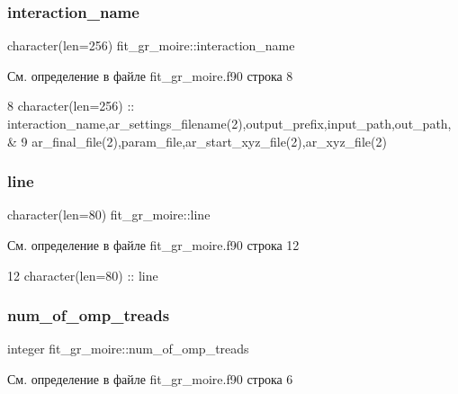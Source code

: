 \subsubsection{\texorpdfstring{interaction\+\_\+name}{interaction\_name}}
{\footnotesize\ttfamily character(len=256) fit\+\_\+gr\+\_\+moire\+::interaction\+\_\+name}



См. определение в файле fit\+\_\+gr\+\_\+moire.\+f90 строка 8


\begin{DoxyCode}
8 \textcolor{comment}{character(len=256)      :: interaction\_name,ar\_settings\_filename(2),output\_prefix,input\_path,out\_path,&}
9                            ar\_final\_file(2),param\_file,ar\_start\_xyz\_file(2),ar\_xyz\_file(2)
\end{DoxyCode}
\mbox{\label{namespacefit__gr__moire_a8fbbcfd1d9c1149a9182a782550ea455}} 
\subsubsection{\texorpdfstring{line}{line}}
{\footnotesize\ttfamily character(len=80) fit\+\_\+gr\+\_\+moire\+::line}



См. определение в файле fit\+\_\+gr\+\_\+moire.\+f90 строка 12


\begin{DoxyCode}
12 \textcolor{comment}{character(len=80)       :: line}
\end{DoxyCode}
\mbox{\label{namespacefit__gr__moire_a6b6dcf709ac2f8f7908b7d38fe795dcc}} 
\subsubsection{\texorpdfstring{num\+\_\+of\+\_\+omp\+\_\+treads}{num\_of\_omp\_treads}}
{\footnotesize\ttfamily integer fit\+\_\+gr\+\_\+moire\+::num\+\_\+of\+\_\+omp\+\_\+treads}



См. определение в файле fit\+\_\+gr\+\_\+moire.\+f90 строка 6

